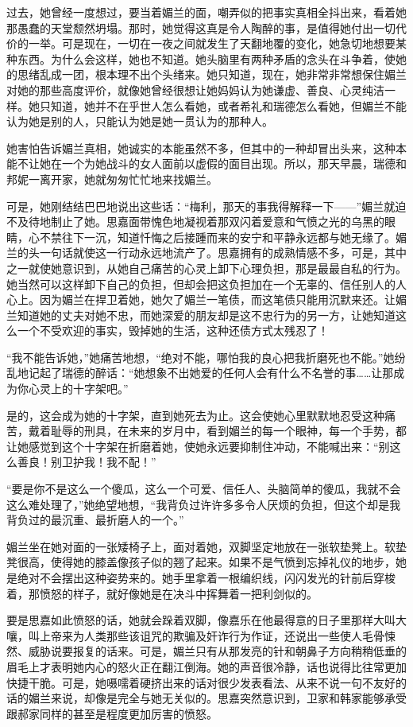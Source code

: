 \par 过去，她曾经一度想过，要当着媚兰的面，嘲弄似的把事实真相全抖出来，看着她那愚蠢的天堂颓然坍塌。那时，她觉得这真是令人陶醉的事，是值得她付出一切代价的一举。可是现在，一切在一夜之间就发生了天翻地覆的变化，她急切地想要某种东西。为什么会这样，她也不知道。她头脑里有两种矛盾的念头在斗争着，使她的思绪乱成一团，根本理不出个头绪来。她只知道，现在，她非常非常想保住媚兰对她的那些高度评价，就像她曾经很想让她妈妈认为她谦虚、善良、心灵纯洁一样。她只知道，她并不在乎世人怎么看她，或者希礼和瑞德怎么看她，但媚兰不能认为她是别的人，只能认为她是她一贯认为的那种人。
\par 她害怕告诉媚兰真相，她诚实的本能虽然不多，但其中的一种却冒出头来，这种本能不让她在一个为她战斗的女人面前以虚假的面目出现。所以，那天早晨，瑞德和邦妮一离开家，她就匆匆忙忙地来找媚兰。
\par 可是，她刚结结巴巴地说出这些话：“梅利，那天的事我得解释一下——”媚兰就迫不及待地制止了她。思嘉面带愧色地凝视着那双闪着爱意和气愤之光的乌黑的眼睛，心不禁往下一沉，知道忏悔之后接踵而来的安宁和平静永远都与她无缘了。媚兰的头一句话就使这一行动永远地流产了。思嘉拥有的成熟情感不多，可是，其中之一就使她意识到，从她自己痛苦的心灵上卸下心理负担，那是最最自私的行为。她当然可以这样卸下自己的负担，但却会把这负担加在一个无辜的、信任别人的人心上。因为媚兰在捍卫着她，她欠了媚兰一笔债，而这笔债只能用沉默来还。让媚兰知道她的丈夫对她不忠，而她深爱的朋友却是这不忠行为的另一方，让她知道这么一个不受欢迎的事实，毁掉她的生活，这种还债方式太残忍了！
\par “我不能告诉她，”她痛苦地想，“绝对不能，哪怕我的良心把我折磨死也不能。”她纷乱地记起了瑞德的醉话：“她想象不出她爱的任何人会有什么不名誉的事……让那成为你心灵上的十字架吧。”
\par 是的，这会成为她的十字架，直到她死去为止。这会使她心里默默地忍受这种痛苦，戴着耻辱的刑具，在未来的岁月中，看到媚兰的每一个眼神，每一个手势，都让她感觉到这个十字架在折磨着她，使她永远要抑制住冲动，不能喊出来：“别这么善良！别卫护我！我不配！”
\par “要是你不是这么一个傻瓜，这么一个可爱、信任人、头脑简单的傻瓜，我就不会这么难处理了，”她绝望地想，“我背负过许许多多令人厌烦的负担，但这个却是我背负过的最沉重、最折磨人的一个。”
\par 媚兰坐在她对面的一张矮椅子上，面对着她，双脚坚定地放在一张软垫凳上。软垫凳很高，使得她的膝盖像孩子似的翘了起来。如果不是气愤到忘掉礼仪的地步，她是绝对不会摆出这种姿势来的。她手里拿着一根编织线，闪闪发光的针前后穿梭着，那愤怒的样子，就好像她是在决斗中挥舞着一把利剑似的。
\par 要是思嘉如此愤怒的话，她就会跺着双脚，像嘉乐在他最得意的日子里那样大叫大嚷，叫上帝来为人类那些该诅咒的欺骗及奸诈行为作证，还说出一些使人毛骨悚然、威胁说要报复的话来。可是，媚兰只有从那发亮的针和朝鼻子方向稍稍低垂的眉毛上才表明她内心的怒火正在翻江倒海。她的声音很冷静，话也说得比往常更加快捷干脆。可是，她嗫嚅着硬挤出来的话对很少发表看法、从来不说一句不友好的话的媚兰来说，却像是完全与她无关似的。思嘉突然意识到，卫家和韩家能够承受跟郝家同样的甚至是程度更加厉害的愤怒。
